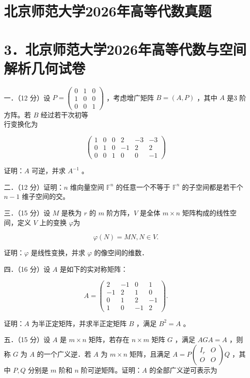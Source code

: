 \documentclass{article}
\begin{document}
\section*{北京师范大学2026年高等代数真题}
\section*{3．北京师范大学2026年高等代数与空间解析几何试卷}
一．（12 分）设 \(P=\left(\begin{array}{lll}0 & 1 & 0 \\ 1 & 0 & 0 \\ 0 & 0 & 1\end{array}\right)\) ，考虑增广矩阵 \(B=(A, P)\) ，其中 \(A\) 是3 阶方阵。若 \(B\) 经过若干次初等\\
行变换化为

\[
\left(\begin{array}{cccccc}
1 & 0 & 0 & 2 & -3 & -3 \\
0 & 1 & 0 & -1 & 2 & 2 \\
0 & 0 & 1 & 0 & 0 & -1
\end{array}\right)
\]

证明：\(A\) 可逆，并求 \(A^{-1}\) 。

二．（12 分）证明：\(n\) 维向量空间 \(\mathbb{F}^{n}\) 的任意一个不等于 \(\mathbb{F}^{n}\) 的子空间都是若干个 \(n-1\) 维子空间的交。

三．（15 分）设 \(M\) 是秩为 \(r\) 的 \(m\) 阶方阵，\(V\) 是全体 \(m \times n\) 矩阵构成的线性空间，定义 \(V\) 上的变换 \(\varphi\)为

\[
\varphi(N)=M N, N \in V .
\]

证明：\(\varphi\) 是线性变换，并求 \(\varphi\) 的像空间的维数．

四．（16 分）设 \(A\) 是如下的实对称矩阵：

\[
A=\left(\begin{array}{cccc}
2 & -1 & 0 & 1 \\
-1 & 2 & 1 & 0 \\
0 & 1 & 2 & -1 \\
1 & 0 & -1 & 2
\end{array}\right) .
\]

证明：\(A\) 为半正定矩阵，并求半正定矩阵 \(B\) ，满足 \(B^{2}=A\) 。

五．（15 分）设 \(A\) 是 \(m \times n\) 矩阵，若存在 \(n \times m\) 矩阵 \(G\) ，满足 \(A G A=A\) ，则称 \(G\) 为 \(A\) 的一个广义逆．若 \(A\) 为 \(m \times n\) 矩阵，且满足 \(A=P\left(\begin{array}{cc}I_{r} & O \\ O & O\end{array}\right) Q\) ，其中 \(P, Q\) 分别是 \(m\) 阶和 \(n\) 阶可逆矩阵。证明：\(A\) 的全部广义逆可表示为
\end{document}
